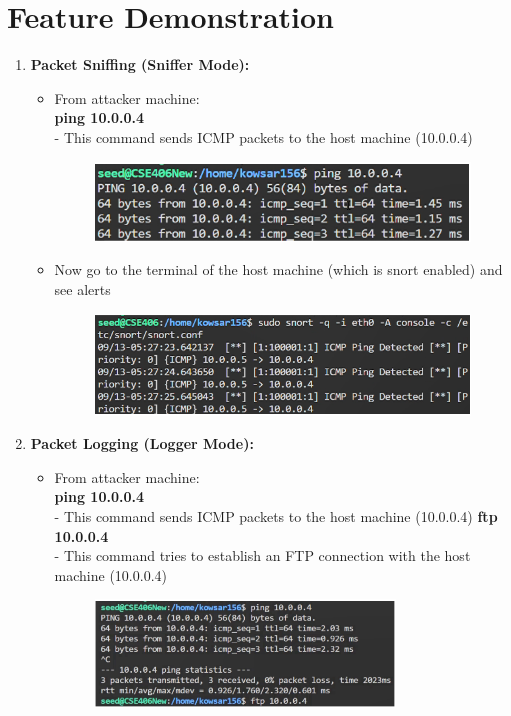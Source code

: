 \documentclass[12pt, A4Paper]{article}
\begin{document}
\section{Feature Demonstration}
\begin{enumerate}
    \item \textbf{\large{Packet Sniffing (Sniffer Mode):}}
    \begin{itemize}
        \item From attacker machine:\\
        \textbf{ping 10.0.0.4}\\
        - This command sends ICMP packets to the host machine (10.0.0.4)
        \begin{figure}[h]
            \centering
            \includegraphics{images/ping}
        \end{figure}

        \item Now go to the terminal of the host machine (which is snort enabled) and see alerts
        \begin{figure}[h]
            \centering
            \includegraphics{images/sniff_alert}
        \end{figure}
    \end{itemize}

    \item \textbf{\large{Packet Logging (Logger Mode):}}
    \begin{itemize}
        \item From attacker machine:\\ 
        \textbf{ping 10.0.0.4}\\
        - This command sends ICMP packets to the host machine (10.0.0.4)
        \textbf{ftp 10.0.0.4}\\
        - This command tries to establish an FTP connection with the host machine (10.0.0.4)\\
        \begin{figure}[h]
            \centering
            \includegraphics[width=0.8\textwidth]{images/ping_ftp}
        \end{figure}


\end{itemize}
\end{enumerate}
\end{document}
